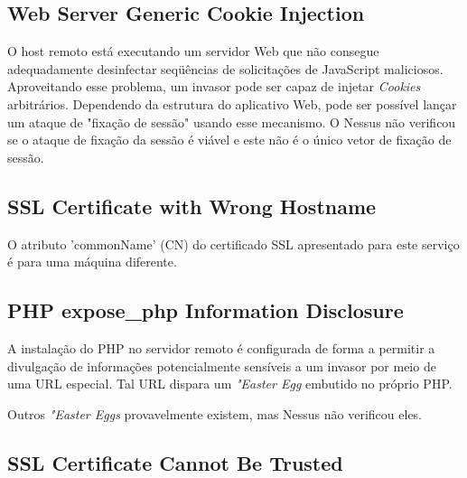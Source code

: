 \documentclass[
	12pt,				%
	openright,			%
	twoside,			%
	a4paper,			%
	english,			%
	french,				%
	spanish,			%
	brazil				%
	]{abntex2}
\begin{document}
\subsection{Web Server Generic Cookie Injection}

 O host remoto está executando um servidor Web que não consegue adequadamente
desinfectar seqüências de solicitações de JavaScript maliciosos.  Aproveitando esse problema, um invasor pode ser capaz de injetar \textit{Cookies} arbitrários.  Dependendo da estrutura do aplicativo Web, pode ser possível lançar um ataque de "fixação de sessão" usando esse mecanismo. O Nessus não verificou se o ataque de fixação da sessão é viável e este não é o único vetor de fixação de sessão.

\subsection{SSL Certificate with Wrong Hostname}
 O atributo 'commonName' (CN) do certificado SSL apresentado para este serviço é para uma máquina diferente.

\subsection{PHP expose\_php Information Disclosure}
 A instalação do PHP no servidor remoto é configurada de forma a permitir a divulgação de informações potencialmente sensíveis a um invasor por meio de uma URL especial.  Tal URL dispara um \textit{"Easter Egg} embutido no próprio PHP. 

Outros \textit{"Easter Eggs} provavelmente existem, mas Nessus não verificou eles.

\subsection{SSL Certificate Cannot Be Trusted}
\end{document}
